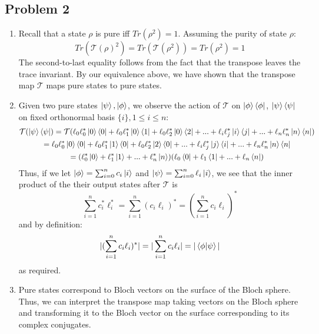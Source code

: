 \documentclass[12pt]{article}%
\begin{document}
\subsection*{Problem 2}
\begin{enumerate}
  \item Recall that a state $\rho$ is pure iff $Tr(\rho^2) = 1$. Assuming the purity of state $\rho$:
  $$ Tr(\mathcal{T}(\rho)^2) = Tr(\mathcal{T}(\rho^2)) = Tr(\rho^2) = 1$$
  The second-to-last equality follows from the fact that the transpose leaves the trace invariant. By our equivalence above, we have shown that the transpose map $\mathcal{T}$ maps pure states to pure states.
  \item Given two pure states $\ket{\psi},\ket{\phi}$, we observe the action of $\mathcal{T}$ on $\ket{\phi}
  \bra{\phi}$, $\ket{\psi}
  \bra{\psi}$ on fixed orthonormal basis $\{i\}, 1 \leq i \leq n$:
    \begin{gather*}
    \mathcal{T}(\ket{\psi}\bra{\psi}) = \mathcal{T}(\ell_0\ell_0^*\ket{0}\bra{0} + \ell_0\ell_1^*\ket{0}\bra{1} + \ell_0\ell_2^*\ket{0}\bra{2} + ... + \ell_{i}\ell_{j}^* \ket{i}\bra{j} + ... + \ell_{n}\ell_n^* \ket{n}\bra{n}) \\
    = \ell_0\ell_0^*\ket{0}\bra{0} + \ell_0\ell_1^*\ket{1}\bra{0} + \ell_0\ell_2^*\ket{2}\bra{0} + ... + \ell_{i}\ell_{j}^* \ket{j}\bra{i} + ... + \ell_{n}\ell_n^* \ket{n}\bra{n} \\
    = (\ell_0^*\ket{0} + \ell_1^* \ket{1} + ... + \ell_n^* \ket{n})(\ell_0 \bra{0} + \ell_1 \bra{1} + ... + \ell_n \bra{n})
    \end{gather*}
    Thus, if we let $\ket{\phi} = \sum_{i=0}^n c_i\ket{i}$ and $\ket{\psi} = \sum_{i = 0}^n \ell_i\ket{i}$,
    we see that the inner product of the their output states after $\mathcal{T}$ is
    $$ \sum_{i=1}^n c_i^*\ell_i^* = \sum_{i=1}^n (c_i\ell_i)^* = (\sum_{i=1}^n c_i\ell_i)^*$$
    and by definition:
    $$ |(\sum_{i=1}^n c_i\ell_i)^*| = |\sum_{i=1}^n c_i\ell_i| = |\bra{\phi}\ket{\psi}|$$ as required.
  \item Pure states correspond to Bloch vectors on the surface of the Bloch  sphere. Thus, we can interpret the transpose map taking vectors on the Bloch sphere and transforming it to the Bloch vector on the surface corresponding to its complex conjugates.
 \end{enumerate}
\end{document}
